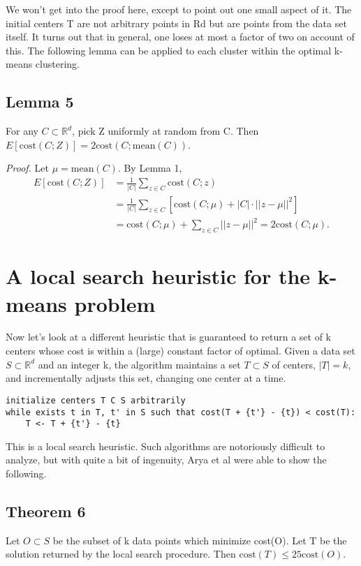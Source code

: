 \documentclass{article}
\begin{document}
We won't get into the proof here, except to point out one small aspect of it. The initial centers T are not arbitrary points in Rd but are points from the data set itself. It turns out that in general, one loses at most a factor of two on account of this. The following lemma can be applied to each cluster within the optimal k-means clustering.

\subsection*{Lemma 5}
For any $C \subset \mathbb{R}^d$, pick Z uniformly at random from C. Then $E[\text{cost}(C; Z)] = 2\text{cost}(C; \text{mean}(C))$.

\textit{Proof.} Let $\mu = \text{mean}(C)$. By Lemma 1,
\begin{align*}
E[\text{cost}(C; Z)] &= \frac{1}{|C|} \sum_{z \in C} \text{cost}(C; z) \\
&= \frac{1}{|C|} \sum_{z \in C} [\text{cost}(C; \mu) + |C| \cdot ||z - \mu||^2] \\
&= \text{cost}(C; \mu) + \sum_{z \in C} ||z - \mu||^2 = 2\text{cost}(C; \mu).
\end{align*}

\section{A local search heuristic for the k-means problem}

Now let's look at a different heuristic that is guaranteed to return a set of k centers whose cost is within a (large) constant factor of optimal. Given a data set $S \subset \mathbb{R}^d$ and an integer k, the algorithm maintains a set $T \subset S$ of centers, $|T| = k$, and incrementally adjusts this set, changing one center at a time.
\begin{verbatim}
initialize centers T C S arbitrarily
while exists t in T, t' in S such that cost(T + {t'} - {t}) < cost(T):
    T <- T + {t'} - {t}
\end{verbatim}
This is a local search heuristic. Such algorithms are notoriously difficult to analyze, but with quite a bit of ingenuity, Arya et al were able to show the following.

\subsection*{Theorem 6}
Let $O \subset S$ be the subset of k data points which minimize cost(O). Let T be the solution returned by the local search procedure. Then $\text{cost}(T) \le 25\text{cost}(O)$.
\end{document}
